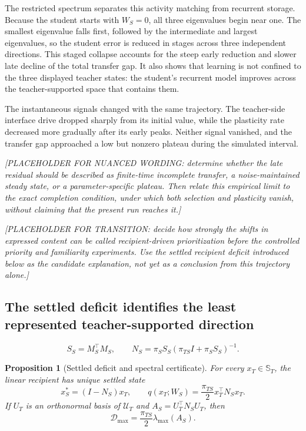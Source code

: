 \documentclass[10pt,letterpaper]{article}
\theoremstyle{plain}
\newtheorem{proposition}{Proposition}
\theoremstyle{remark}
\begin{document}
The restricted spectrum separates this activity matching from recurrent storage. Because the student starts with $W_S=0$, all three eigenvalues begin near one. The smallest eigenvalue falls first, followed by the intermediate and largest eigenvalues, so the student error is reduced in stages across three independent directions. This staged collapse accounts for the steep early reduction and slower late decline of the total transfer gap. It also shows that learning is not confined to the three displayed teacher states: the student's recurrent model improves across the teacher-supported space that contains them.

The instantaneous signals changed with the same trajectory. The teacher-side interface drive dropped sharply from its initial value, while the plasticity rate decreased more gradually after its early peaks. Neither signal vanished, and the transfer gap approached a low but nonzero plateau during the simulated interval.

\textit{[PLACEHOLDER FOR NUANCED WORDING: determine whether the late residual should be described as finite-time incomplete transfer, a noise-maintained steady state, or a parameter-specific plateau. Then relate this empirical limit to the exact completion condition, under which both selection and plasticity vanish, without claiming that the present run reaches it.]}

\textit{[PLACEHOLDER FOR TRANSITION: decide how strongly the shifts in expressed content can be called recipient-driven prioritization before the controlled priority and familiarity experiments. Use the settled recipient deficit introduced below as the candidate explanation, not yet as a conclusion from this trajectory alone.]}

\subsection{The settled deficit identifies the least represented teacher-supported direction}

\begin{equation}
S_S=M_S^\top M_S,
\qquad
N_S=\pi_SS_S(\pi_{TS}I+\pi_SS_S)^{-1}.
\label{eq:novelty-operator}
\end{equation}

\begin{proposition}[Settled deficit and spectral certificate]
\label{prop:deficit}
For every $x_T\in\mathbb S_T$, the linear recipient has unique settled state
\begin{equation}
x_S^*=(I-N_S)x_T,
\qquad
q(x_T;W_S)=\frac{\pi_{TS}}2x_T^\top N_Sx_T.
\end{equation}
If $U_T$ is an orthonormal basis of $\mathcal U_T$ and $A_S=U_T^\top N_SU_T$, then
\begin{equation}
\mathcal D_{\max}=\frac{\pi_{TS}}2\lambda_{\max}(A_S).
\label{eq:deficit-spectrum}
\end{equation}
\end{proposition}
\end{document}
